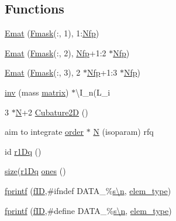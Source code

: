 \subsection*{Functions}
\begin{DoxyCompactItemize}
\item 
\hyperlink{a01014_a897368b80c690bb1d86a139b2e32f062}{Emat} (\hyperlink{a00575_a53fedbe0b7d30bbdae17dd4984fb3177}{Fmask}(\+:, 1), 1\+:\hyperlink{a00575_a20f422f104b7455cf2904b755786b44f}{Nfp})
\item 
\hyperlink{a01014_a60824f742b56f2e7937c971600df7da0}{Emat} (\hyperlink{a00575_a53fedbe0b7d30bbdae17dd4984fb3177}{Fmask}(\+:, 2), \hyperlink{a00575_a20f422f104b7455cf2904b755786b44f}{Nfp}+1\+:2 $\ast$\hyperlink{a00575_a20f422f104b7455cf2904b755786b44f}{Nfp})
\item 
\hyperlink{a01014_a1afcdf2927c1ba1a2c01991ac8791bab}{Emat} (\hyperlink{a00575_a53fedbe0b7d30bbdae17dd4984fb3177}{Fmask}(\+:, 3), 2 $\ast$\hyperlink{a00575_a20f422f104b7455cf2904b755786b44f}{Nfp}+1\+:3 $\ast$\hyperlink{a00575_a20f422f104b7455cf2904b755786b44f}{Nfp})
\item 
\hyperlink{a01014_a0c752aad07d6c7e22d2e63df41ccdf8b}{inv} (mass \hyperlink{a01014_af07ff1035f34d77764ff516f110e6832}{matrix}) $\ast$\textbackslash{}I\+\_\+n(L\+\_\+i
\item 
3 $\ast$\hyperlink{a00473_a5b9c4563028063ee53b517cce9aa701b}{N}+2 \hyperlink{a01014_a35d9a281e74f29c5f8d971883d179009}{Cubature2D} ()
\item 
aim to integrate \hyperlink{a00611_aab21ede0c02820806e77fd7890ee6bd7}{order} $\ast$ \hyperlink{a01014_a5b9c4563028063ee53b517cce9aa701b}{N} (isoparam) rfq
\item 
id \hyperlink{a01014_a79d685dcbb9027705142b2a8b912aa1e}{r1\+Dq} ()
\item 
\hyperlink{a00611_ad6cb0afbbe6ea4f56407890be2533966}{size}(\hyperlink{a00473_a79d685dcbb9027705142b2a8b912aa1e}{r1\+Dq} \hyperlink{a01014_a6d4fbbd46e46569dab2b0ad8372e0220}{ones} ()
\item 
\hyperlink{a01014_a1c26c3e6fd09ad3f614fd2a28762dfe8}{fprintf} (\hyperlink{a00473_ae0527cbfd56392d5095a691bbf10ba5b}{f\+ID},\textquotesingle{}\#ifndef D\+A\+T\+A\+\_\+\%\hyperlink{a00623_a781a04ab095280f838ff3eb0e51312e0}{s\textbackslash{}n}\textquotesingle{}, \hyperlink{a00473_a9e84386471d07238c03b10507f58eba9}{elem\+\_\+type})
\item 
\hyperlink{a01014_a1bb04a6273aae6e9af3378600ca9fcb3}{fprintf} (\hyperlink{a00473_ae0527cbfd56392d5095a691bbf10ba5b}{f\+ID},\textquotesingle{}\#define D\+A\+T\+A\+\_\+\%\hyperlink{a00623_a781a04ab095280f838ff3eb0e51312e0}{s\textbackslash{}n}\textquotesingle{}, \hyperlink{a00473_a9e84386471d07238c03b10507f58eba9}{elem\+\_\+type})

\end{DoxyCompactItemize}
